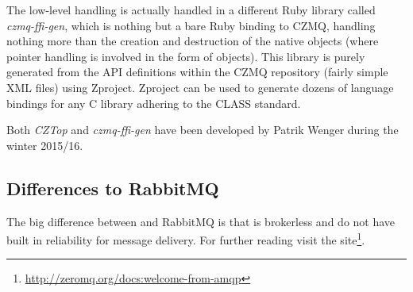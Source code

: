 The low-level handling is actually handled in a different Ruby library called
\emph{czmq-ffi-gen}, which is nothing but a bare Ruby binding to CZMQ, handling
nothing more than the creation and destruction of the native objects (where
pointer handling is involved in the form of  objects). This
library is purely generated from the API definitions within the CZMQ repository
(fairly simple XML files) using Zproject. Zproject can be used to generate
dozens of language bindings for any C library adhering to the \gls{CLASS}
standard.

Both \emph{CZTop} and \emph{czmq-ffi-gen} have been developed by Patrik Wenger
during the winter 2015/16.

\subsection{Differences to RabbitMQ}
The big difference between \zmq and RabbitMQ is that \zmq is brokerless and do not 
have built in reliability for message delivery. For further reading 
visit the \zmq site\footnote{\url{http://zeromq.org/docs:welcome-from-amqp}}.
